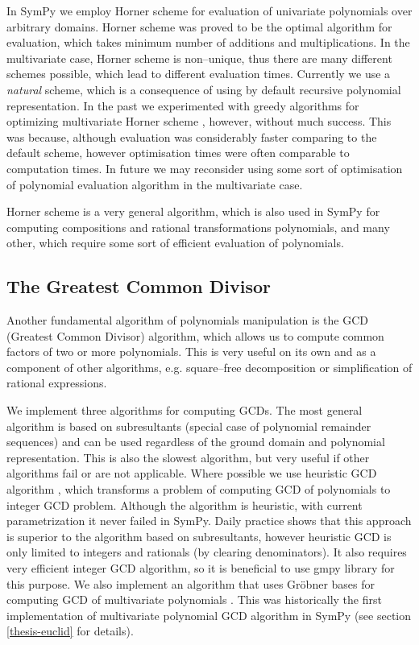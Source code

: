 In SymPy we employ Horner scheme \cite{Geddes1992algorithms} for evaluation of univariate polynomials
over arbitrary domains. Horner scheme was proved to be the optimal algorithm for evaluation, which
takes minimum number of additions and multiplications. In the multivariate case, Horner scheme is
non--unique, thus there are many different schemes possible, which lead to different evaluation
times. Currently we use a \emph{natural} scheme, which is a consequence of using by default recursive
polynomial representation. In the past we experimented with greedy algorithms for optimizing
multivariate Horner scheme \cite{Ceberio2004greedy}, however, without much success. This was because,
although evaluation was considerably faster comparing to the default scheme, however optimisation
times were often comparable to computation times. In future we may reconsider using some sort of
optimisation of polynomial evaluation algorithm in the multivariate case.

Horner scheme is a very general algorithm, which is also used in SymPy for computing compositions
and rational transformations polynomials, and many other, which require some sort of efficient
evaluation of polynomials.


\subsection{The Greatest Common Divisor}

Another fundamental algorithm of polynomials manipulation is the GCD (Greatest Common Divisor)
algorithm, which allows us to compute common factors of two or more polynomials. This is very
useful on its own and as a component of other algorithms, e.g. square--free decomposition or
simplification of rational expressions.

We implement three algorithms for computing GCDs. The most general algorithm is based on
subresultants (special case of polynomial remainder sequences) and can be used regardless
of the ground domain and polynomial representation. This is also the slowest algorithm, but
very useful if other algorithms fail or are not applicable. Where possible we use heuristic
GCD algorithm \cite{Liao1995heuristic}, which transforms a problem of computing GCD of polynomials
to integer GCD problem. Although the algorithm is heuristic, with current parametrization it
never failed in SymPy. Daily practice shows that this approach is superior to the algorithm
based on subresultants, however heuristic GCD is only limited to integers and rationals (by
clearing denominators). It also requires very efficient integer GCD algorithm, so it is
beneficial to use gmpy library for this purpose. We also implement an algorithm that uses
Gröbner bases for computing GCD of multivariate polynomials \cite{Cox1997ideals}. This was
historically the first implementation of multivariate polynomial GCD algorithm in SymPy
(see section \ref{thesis-euclid} for details).

